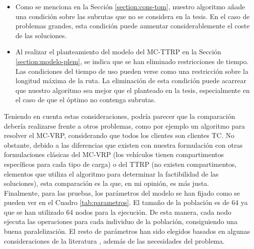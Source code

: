 \begin{itemize}
    \item Como se menciona en la Sección \ref{section:cons-tom}, nuestro algoritmo añade una condición sobre las subrutas que no se considera en la tesis. En el caso de problemas grandes, esta condición puede aumentar considerablemente el coste de las soluciones.
    \item Al realizar el planteamiento del modelo del MC-TTRP en la Sección \ref{section:modelo-plem}, se indica que se han eliminado restricciones de tiempo. Las condiciones del tiempo de uso pueden verse como una restricción sobre la longitud máxima de la ruta. La eliminación de esta condición puede acarrear que nuestro algoritmo sea mejor que el planteado en la tesis, especialmente en el caso de que el óptimo no contenga subrutas.
\end{itemize}   

Teniendo en cuenta estas consideraciones, podría parecer que la comparación debería realizarse frente a otros problemas, como por ejemplo un algoritmo para resolver el MC-VRP, considerando que todos los clientes son clientes TC. No obstante, debido a las diferencias que existen con nuestra formulación con otras formulaciones clásicas del MC-VRP (los vehículos tienen compartimentos específicos para cada tipo de carga) o del TTRP (no existen compartimentos, elementos que utiliza el algoritmo para determinar la factibilidad de las soluciones), esta comparación es la que, en mi opinión, es más justa.\\

Finalmente, para las pruebas, los parámetros del modelo se han fijado como se pueden ver en el Cuadro \ref{tab:parametros}. El tamaño de la población es de 64 ya que se han utilizado 64 nodos para la ejecución. De esta manera, cada nodo ejecuta las operaciones para cada individuo de la población, consiguiendo una buena paralelización. El resto de parámetros han sido elegidos basados en algunas consideraciones de la literatura \cite{prins-2003}, además de las necesidades del problema.
\begin{table}[t]
    \centering
    \caption{Parámetros para la ejecución de las pruebas.}
    \label{tab:parametros}
\end{table}

